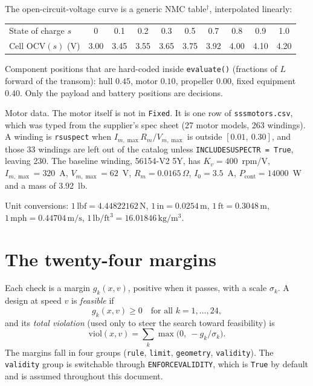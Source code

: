 \documentclass[11pt,a4paper]{article}
\renewcommand{\_}{\textunderscore\allowbreak}
\newcommand{\code}[1]{\texttt{#1}}
\begin{document}
The open-circuit-voltage curve is a generic NMC table$^\dagger$, interpolated linearly:
\begin{center}\small
\begin{tabular}{@{}l *{9}{c}@{}}
\toprule
State of charge $s$ & 0 & 0.1 & 0.2 & 0.3 & 0.5 & 0.7 & 0.8 & 0.9 & 1.0 \\
Cell $\mathrm{OCV}(s)$ (V) & 3.00 & 3.45 & 3.55 & 3.65 & 3.75 & 3.92 & 4.00 & 4.10 & 4.20 \\
\bottomrule
\end{tabular}
\end{center}

Component positions that are hard-coded inside \code{evaluate()} (fractions of $L$ forward of the transom):
hull $0.45$, motor $0.10$, propeller $0.00$, fixed equipment $0.40$. Only the payload and battery positions are decisions.

Motor data. The motor itself is not in \code{Fixed}. It is one row of \code{sss\_motors.csv}, which was typed from the supplier's spec sheet (27 motor models, 263 windings). A winding is \code{r\_suspect} when $I_{m,\max}R_m/V_{m,\max}$ is outside $[0.01,\ 0.30]$, and those 33 windings are left out of the catalog unless \code{INCLUDE\_SUSPECT\_R = True}, leaving 230. The baseline winding, 56154-V2 5Y, has $K_v=400$~rpm/V, $I_{m,\max}=320$~A, $V_{m,\max}=62$~V, $R_m=0.0165\,\Omega$, $I_0=3.5$~A, $P_{\mathrm{cont}}=14000$~W and a mass of 3.92~lb.

Unit conversions: $1\,\mathrm{lbf}=4.44822162\,\mathrm N$, $1\,\mathrm{in}=0.0254\,\mathrm m$,
$1\,\mathrm{ft}=0.3048\,\mathrm m$, $1\,\mathrm{mph}=0.44704\,\mathrm{m/s}$, $1\,\mathrm{lb/ft^3}=16.01846\,\mathrm{kg/m^3}$.


\section{The twenty-four margins}
\label{sec:constraints}

Each check is a margin $g_k(x,v)$, positive when it passes, with a scale $\sigma_k$. A design at speed $v$ is
\emph{feasible} if
\begin{equation}
  g_k(x,v) \ge 0 \quad \text{for all } k = 1,\dots,24,
  \label{eq:feasible}
\end{equation}
and its \emph{total violation} (used only to steer the search toward feasibility) is
\begin{equation}
  \mathrm{viol}(x,v) = \sum_k \max\!\bigl(0,\ -g_k/\sigma_k\bigr).
  \label{eq:violation}
\end{equation}
The margins fall in four groups (\code{rule}, \code{limit}, \code{geometry}, \code{validity}). The \code{validity}
group is switchable through \code{ENFORCE\_VALIDITY}, which is \code{True} by default and is assumed throughout this document.
\end{document}
